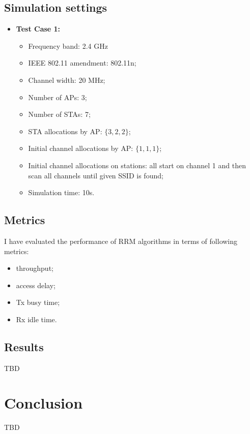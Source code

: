 \subsection{Simulation settings}
\begin{itemize}
    \item \textbf{Test Case 1:}
    \begin{itemize}
        \item Frequency band: 2.4 GHz
        \item IEEE 802.11 amendment: 802.11n;
        \item Channel width: 20 MHz;
        \item Number of APs: 3;
        \item Number of STAs: 7;
        \item STA allocations by AP: $\{3, 2, 2\}$;
        \item Initial channel allocations by AP: $\{1, 1, 1\}$;
        \item Initial channel allocations on stations: all start on channel 1 and then scan all channels until given SSID is found;
        \item Simulation time: 10s.
    \end{itemize}
\end{itemize}

\subsection{Metrics}
I have evaluated the performance of RRM algorithms in terms of following metrics:
\begin{itemize}
    \item throughput;
    \item access delay;
    \item Tx busy time;
    \item Rx idle time.
\end{itemize}

\subsection{Results}
TBD


\section{Conclusion}
\label{chap:impl:sec:conclusion}
TBD